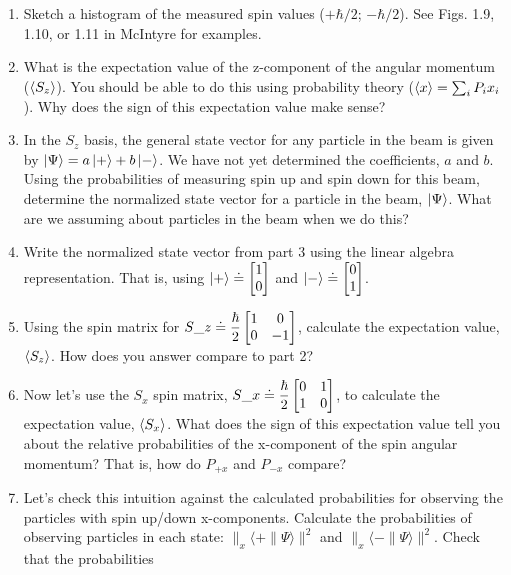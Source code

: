 \documentclass[
]{article}
\providecommand{\tightlist}{%
  \setlength{\itemsep}{0pt}\setlength{\parskip}{0pt}}
\providecommand{\tightlist}{%
  \setlength{\itemsep}{0pt}\setlength{\parskip}{0pt}}
\begin{document}
\begin{enumerate}
\def\labelenumi{\arabic{enumi}.}
\tightlist
\item
  Sketch a histogram of the measured spin values (\(+\hbar/2\);
  \(-\hbar/2\)). See Figs. 1.9, 1.10, or 1.11 in McIntyre for examples.
\item
  What is the expectation value of the z-component of the angular
  momentum (\(\braket{S_z}\)). You should be able to do this using
  probability theory (\(\braket{x} = \sum_i P_i x_i\)). Why does the
  sign of this expectation value make sense?
\item
  In the \(S_z\) basis, the general state vector for any particle in the
  beam is given by \(\ket{\Psi} = a\ket{+} + b\ket{-}\). We have not yet
  determined the coefficients, \(a\) and \(b\). Using the probabilities
  of measuring spin up and spin down for this beam, determine the
  normalized state vector for a particle in the beam, \(\ket{\Psi}\).
  What are we assuming about particles in the beam when we do this?
\item
  Write the normalized state vector from part 3 using the linear algebra
  representation. That is, using $\ket{+} \doteq \begin{bmatrix} 1 \cr 0 \end{bmatrix}$ and \(\ket{-} \doteq \begin{bmatrix} 0 \cr 1\end{bmatrix}\).
\item
  Using the spin matrix for $S\_z \doteq \dfrac{\hbar}{2}\begin{bmatrix} 1 & 0 \cr 0 & -1 \end{bmatrix}$, calculate the expectation value, \(\braket{S_z}\). How does you
  answer compare to part 2?
\item
  Now let's use the \(S_x\) spin matrix, $S\_x \doteq \dfrac{\hbar}{2}\begin{bmatrix} 0 & 1 \cr 1 & 0 \end{bmatrix}$, to calculate the expectation value, \(\braket{S_x}\). What does
  the sign of this expectation value tell you about the relative
  probabilities of the x-component of the spin angular momentum? That
  is, how do \(P_{+x}\) and \(P_{-x}\) compare?
\item
  Let's check this intuition against the calculated probabilities for
  observing the particles with spin up/down x-components. Calculate the
  probabilities of observing particles in each state:
  \(\|_x\langle + \| \Psi \rangle\|^2\) and
  \(\|_x\langle - \| \Psi \rangle\|^2\). Check that the probabilities

\end{enumerate}
\end{document}
